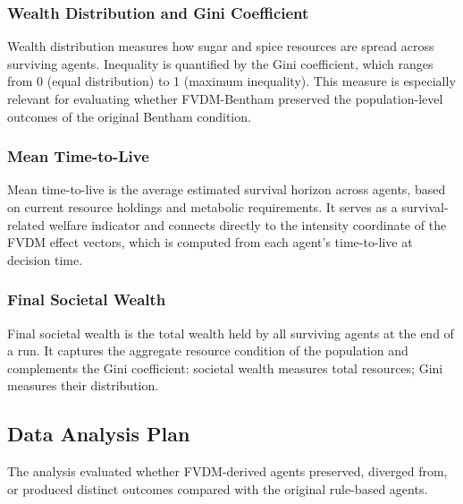 \documentclass{icsthesis}
\begin{document}
\begin{mainmatter}
\subsubsection{Wealth Distribution and Gini Coefficient}
Wealth distribution measures how sugar and spice resources are spread across surviving agents. Inequality is quantified by the Gini coefficient, which ranges from 0 (equal distribution) to 1 (maximum inequality). This measure is especially relevant for evaluating whether FVDM-Bentham preserved the population-level outcomes of the original Bentham condition.

\subsubsection{Mean Time-to-Live}
Mean time-to-live is the average estimated survival horizon across agents, based on current resource holdings and metabolic requirements. It serves as a survival-related welfare indicator and connects directly to the intensity coordinate of the FVDM effect vectors, which is computed from each agent's time-to-live at decision time.

\subsubsection{Final Societal Wealth}
Final societal wealth is the total wealth held by all surviving agents at the end of a run. It captures the aggregate resource condition of the population and complements the Gini coefficient: societal wealth measures total resources; Gini measures their distribution.

\subsection{Data Analysis Plan}
The analysis evaluated whether FVDM-derived agents preserved, diverged from, or produced distinct outcomes compared with the original rule-based agents.


\end{mainmatter}
\end{document}
